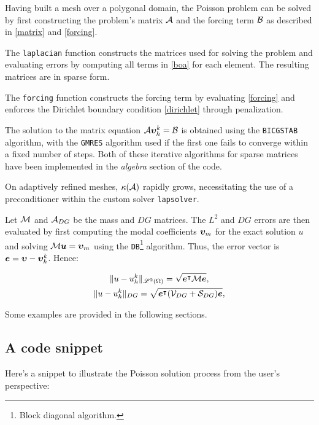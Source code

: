 Having built a mesh over a polygonal domain, the Poisson problem can be solved by first constructing the problem's matrix $\mathcal{A}$ and the forcing term $\mathcal{B}$ as described in \eqref{matrix} and \eqref{forcing}.

The \lstinline{laplacian} function constructs the matrices used for solving the problem and evaluating errors by computing all terms in \eqref{boa} for each element. The resulting matrices are in sparse form.

The \lstinline{forcing} function constructs the forcing term by evaluating \eqref{forcing} and enforces the Dirichlet boundary condition \eqref{dirichlet} through penalization.

\cite{Saad2003} The solution to the matrix equation $\mathcal{A} \bm{\upsilon}^k_h = \mathcal{B}$ is obtained using the \lstinline{BICGSTAB} algorithm, with the \lstinline{GMRES} algorithm used if the first one fails to converge within a fixed number of steps. Both of these iterative algorithms for sparse matrices have been implemented in the \textit{algebra} section of the code.

On adaptively refined meshes, $\kappa(\mathcal{A})$ rapidly grows, necessitating the use of a preconditioner within the custom solver \lstinline{lapsolver}.

Let $\mathcal{M}$ and $\mathcal{A}_{DG}$ be the mass and $DG$ matrices. The $L^2$ and $DG$ errors are then evaluated by first computing the modal coefficients $\bm{\upsilon}_m$ for the exact solution $u$ and solving $\mathcal{M} \bm{u} = \bm{\upsilon}_m$ using the \lstinline{DB}\footnote{Block diagonal algorithm.} algorithm. Thus, the error vector is $\bm{e} = \bm{\upsilon} - \bm{\upsilon}^k_h$. Hence:

\begin{gather}
    \lVert u - u^k_h \rVert_{\mathscr{L}^2(\Omega)} = \sqrt{\bm{e}^\intercal \mathcal{M} \bm{e}}, \\
    \lVert u - u^k_h \rVert_{DG} = \sqrt{\bm{e}^\intercal (\mathcal{V}_{DG} + \mathcal{S}_{DG}) \bm{e}},
\end{gather}

Some examples are provided in the following sections.

\newpage
\subsection{A code snippet}

Here's a snippet to illustrate the Poisson solution process from the user's perspective:

